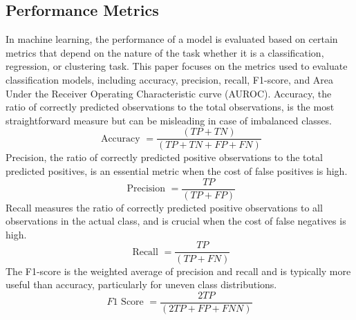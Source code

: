 \documentclass[12pt]{report}
\begin{document}
\subsection*{Performance Metrics}
In machine learning, the performance of a model is evaluated based on certain
metrics that depend on the nature of the task whether it is a classification,
regression, or clustering task. This paper focuses on the metrics used to
evaluate classification models, including accuracy, precision, recall,
F1-score, and Area Under the Receiver Operating Characteristic curve (AUROC).
Accuracy, the ratio of correctly predicted observations to the total
observations, is the most straightforward measure but can be misleading in case
of imbalanced classes\cite{powers2011evaluation}.\[ \text { Accuracy }=\frac{(T P+T N)}{(T P+T N+F P+F N)} \] Precision, the ratio of correctly
predicted positive observations to the total predicted positives, is an
essential metric when the cost of false positives is high\cite{sokolova2009systematic}.\[ \text { Precision }=\frac{T P}{(T P+F P)} \]
Recall measures the ratio of correctly predicted positive observations to all
observations in the actual class, and is crucial when the cost of false
negatives is high\cite{sokolova2009systematic}.\[ \text { Recall }=\frac{T P}{(T P+F N)} \] The F1-score is the weighted average of precision and recall
and is typically more useful than accuracy, particularly for uneven class
distributions\cite{van1979information}. \[ F 1 \text { Score }=\frac{2 T P}{(2T P+F P+F N N)} \]

\end{document}
